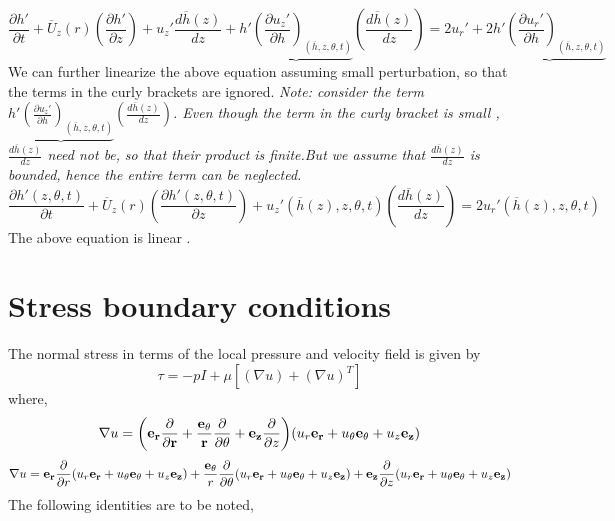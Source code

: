 \documentclass{article}
\begin{document}
\begin{equation}
\frac{\partial h'}{\partial t}+\overline{U}_{z}(r)\left(\frac{\partial h'}{\partial z}\right)+u_{z}'\frac{d\overline{h}(z)}{dz}+\underbrace{h'\left(\frac{\partial u_{z}'}{\partial h}\right)_{(\overline{h},z,\theta,t)}}\left(\frac{d\overline{h}(z)}{dz}\right)=2u_{r}'+2\underbrace{h'\left(\frac{\partial u_{r}'}{\partial h}\right)_{(\overline{h},z,\theta,t)}}
\end{equation}
We can further linearize the above equation assuming small perturbation,
so that the terms in the curly brackets are ignored.
\emph{Note: consider the term $\underbrace{h'\left(\frac{\partial u_{z}'}{\partial h}\right)_{(\overline{h},z,\theta,t)}}\left(\frac{d\overline{h}(z)}{dz}\right)$.
Even though the term in the curly bracket is small , $\frac{d\overline{h}(z)}{dz}$
need not be, }
\emph{so that their product is finite.But we assume that $\frac{d\overline{h}(z)}{dz}$
is bounded, hence the entire term can be neglected.}
\begin{equation}
\frac{\partial h'(z,\theta,t)}{\partial t}+\overline{U}_{z}(r)\left(\frac{\partial h'(z,\theta,t)}{\partial z}\right)+u_{z}'(\overline{h}(z),z,\theta,t)\left(\frac{d\overline{h}(z)}{dz}\right)=2u_{r}'(\overline{h}(z),z,\theta,t)
\end{equation}
The above equation is linear .
\section{Stress boundary conditions}
The normal stress in terms of the local pressure and velocity field is given by 
\begin{equation}
\label{tau}
\tau = -pI + \mu[(\nabla u)+ (\nabla u)^T]
\end{equation}
where,
\begin{equation}
\nabla u = \bigg({\bf e_{r}\frac{\partial}{\partial r} + \frac{{\bf e_{\theta}}}{r}\frac{\partial }{\partial \theta } + {\bf e_{z}}}\frac{\partial}{\partial z}\bigg)(u_{r}{\bf e_{r}} + u_{\theta}{\bf e_{\theta}} + u_{z}{\bf e_{z}}) 
\end{equation}
\begin{equation}
\label{gradu}
\nabla u = {\bf e_{r}}\frac{\partial}{\partial r} (u_{r}{\bf e_{r}} + u_{\theta}{\bf e_{\theta}} + u_{z}{\bf e_{z}}) + \frac{{\bf e_{\theta}}}{r}\frac{\partial}{\partial \theta} (u_{r}{\bf e_{r}} + u_{\theta}{\bf e_{\theta}} + u_{z}{\bf e_{z}}) 
+ {\bf e_{z}}\frac{\partial}{\partial z} (u_{r}{\bf e_{r}} + u_{\theta}{\bf e_{\theta}} + u_{z}{\bf e_{z}})
\end{equation}
The following identities are to be noted, 
\end{document}
